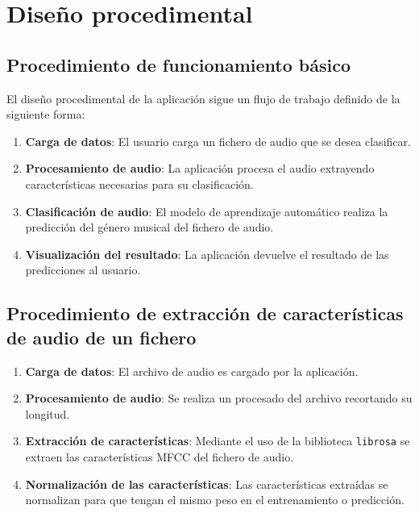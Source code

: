 \section{Diseño procedimental}

\subsection{Procedimiento de funcionamiento básico}

El diseño procedimental de la aplicación sigue un flujo de trabajo definido de la siguiente forma:

\begin{enumerate}
\tightlist

\item \textbf{Carga de datos}: El usuario carga un fichero de audio que se desea clasificar.

\item \textbf{Procesamiento de audio}: La aplicación procesa el audio extrayendo características necesarias para su clasificación.

\item \textbf{Clasificación de audio}: El modelo de aprendizaje automático realiza la predicción del género musical del fichero de audio.

\item \textbf{Visualización del resultado}: La aplicación devuelve el resultado de las predicciones al usuario.

\end{enumerate}


\subsection{Procedimiento de extracción de características de audio de un fichero}

\begin{enumerate}
\tightlist

\item \textbf{Carga de datos}: El archivo de audio es cargado por la aplicación.

\item \textbf{Procesamiento de audio}: Se realiza un procesado del archivo recortando su longitud.

\item \textbf{Extracción de características}: Mediante el uso de la biblioteca \texttt{librosa} se extraen las características MFCC del fichero de audio.

\item \textbf{Normalización de las características}: Las características extraídas se normalizan para que tengan el mismo peso en el entrenamiento o predicción.

\end{enumerate}

